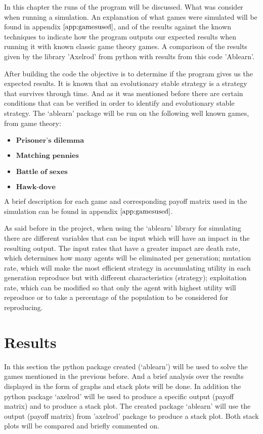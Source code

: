 \label{ch:codeapp}
In this chapter the runs of the program will be discussed. What was consider when running a simulation. An explanation of what games were simulated will be found in appendix $\ref{app:gamesused}$, and of the results against the known techniques to indicate how the program outputs our expected results when running it with known classic game theory games. A comparison of the results given by the  library 'Axelrod' from python with results from this code 'Ablearn'.

After building the code the objective is to determine if the program gives us the expected results. It is  known that an evolutionary stable strategy is a strategy that survives through time. And as it was mentioned before there are certain conditions that can  be verified in order to identify and evolutionary stable strategy.  The `ablearn' package will be run on the following well known games, from game theory:

\begin{itemize}
	\item $\textbf{Prisoner's dilemma}$
	\item $\textbf{Matching pennies}$ 
	\item $\textbf{Battle of sexes}$ 
	\item $\textbf{Hawk-dove}$ 
\end{itemize}

A brief description for each game and corresponding payoff matrix used in the simulation can be found in appendix $\ref{app:gamesused}$.

As said before in the project, when using the `ablearn' library for simulating there are different variables that can be input which will have an impact in the resulting output. The input rates that have a greater impact are death rate, which determines how many agents will be eliminated per generation; mutation rate, which will make the most efficient strategy in accumulating utility in each generation reproduce but with different characteristics (strategy); exploitation rate, which can be modified so that only the agent with highest utility will reproduce or to take a percentage of the population to be considered for reproducing.

\newpage
\section{Results}
In this section the python package created (`ablearn') will be used to solve the games mentioned in the previous before. And a brief analysis over the results displayed in the form of graphs and stack plots will be done. In addition the python package `axelrod' will be used to produce a specific output (payoff matrix) and to produce a stack plot. The created package `ablearn'  will use the output (payoff matrix) from 'axelrod' package to produce a stack plot. Both stack plots will be compared and briefly commented on.  


